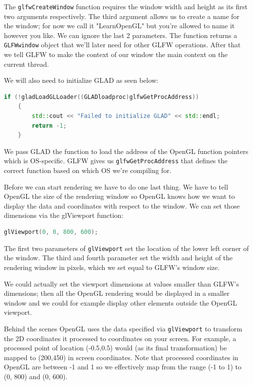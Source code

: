 The \verb|glfwCreateWindow| function requires the window width and height as its first two arguments respectively. The third argument allows us to create a name for the window; for now we call it "LearnOpenGL" but you're allowed to name it however you like. We can ignore the last 2 parameters. The function returns a \verb|GLFWwindow| object that we'll later need for other GLFW operations. After that we tell GLFW to make the context of our window the main context on the current thread.

We will also need to initialize GLAD as seen below:

\begin{lstlisting}[language=C++]
    if (!gladLoadGLLoader((GLADloadproc)glfwGetProcAddress))
    {
        std::cout << "Failed to initialize GLAD" << std::endl;
        return -1;
    }    
\end{lstlisting}

We pass GLAD the function to load the address of the OpenGL function pointers which is OS-specific. GLFW gives us \verb|glfwGetProcAddress| that defines the correct function based on which OS we're compiling for.

Before we can start rendering we have to do one last thing. We have to tell OpenGL the size of the rendering window so OpenGL knows how we want to display the data and coordinates with respect to the window. We can set those dimensions via the glViewport function:

\begin{lstlisting}[language=C++]
    glViewport(0, 0, 800, 600);
\end{lstlisting}

The first two parameters of \verb|glViewport| set the location of the lower left corner of the window. The third and fourth parameter set the width and height of the rendering window in pixels, which we set equal to GLFW's window size.

We could actually set the viewport dimensions at values smaller than GLFW's dimensions; then all the OpenGL rendering would be displayed in a smaller window and we could for example display other elements outside the OpenGL viewport.

\newpage

\begin{note}
    Behind the scenes OpenGL uses the data specified via \verb|glViewport| to transform the 2D coordinates it processed to coordinates on your screen. For example, a processed point of location (-0.5,0.5) would (as its final transformation) be mapped to (200,450) in screen coordinates. Note that processed coordinates in OpenGL are between -1 and 1 so we effectively map from the range (-1 to 1) to (0, 800) and (0, 600).
\end{note}

